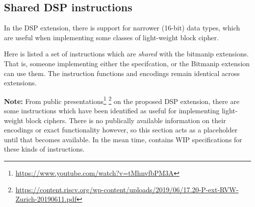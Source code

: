 
\subsection{Shared DSP instructions}
\label{sec:spec:shared:dsp}

In the DSP extension, there is support for narrower (16-bit)
data types, which are useful when implementing some classes of
light-weight block cipher.

Here is listed a set of instructions which are {\em shared} with
the bitmanip extensions.
That is, someone implementing either the \XCRYPTO specifcation, or
the Bitmanip extension can use them.
The instruction functions and encodings remain identical across extensions.


{\bf Note:} From public presentations\footnote{
\url{https://www.youtube.com/watch?v=tMhnvfbPM3A}
}
\footnote{
\url{https://content.riscv.org/wp-content/uploads/2019/06/17.20-P-ext-RVW-Zurich-20190611.pdf}
}
on the proposed DSP
extension, there are some instructions which have been identified as
useful for implementing light-weight block ciphers.
There is no publically available information on their encodings
or exact functionality however, so this section acts as a placeholder
until that becomes available.
In the mean time,
contains WIP specifications for these kinds of instructions.
